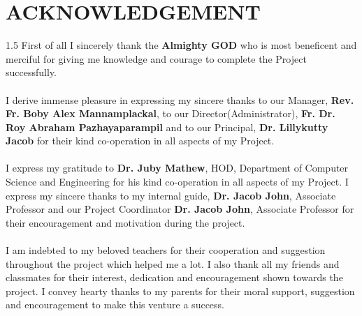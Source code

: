\chapter*{ACKNOWLEDGEMENT}
\begin{spacing}{1.5}
First of all I sincerely thank the \textbf{Almighty GOD} who is most beneficent and merciful for giving me knowledge and courage to complete the  Project successfully.\\\\
I derive immense pleasure in expressing my sincere thanks to our Manager, \textbf{ Rev. Fr. Boby Alex Mannamplackal}, to our Director(Administrator), \textbf{Fr. Dr. Roy Abraham Pazhayaparampil} and to our Principal, \textbf{Dr. Lillykutty Jacob} for their kind co-operation in all aspects of my Project.\\\\
I express my gratitude to \textbf{Dr. Juby Mathew}, HOD, Department of Computer Science and Engineering for his kind co-operation in all aspects of my Project. I express my sincere thanks to my internal guide, \textbf{Dr. Jacob John}, Associate Professor and our Project Coordinator \textbf{Dr. Jacob John}, Associate Professor for their encouragement and motivation during the project.\\\\
I am indebted to my beloved teachers for their cooperation and suggestion throughout the project which helped me a lot. I also thank all my friends and classmates for their interest, dedication and encouragement shown towards the project. I convey hearty thanks to my parents for their moral support, suggestion and encouragement to make this venture a success.


\end{spacing}
